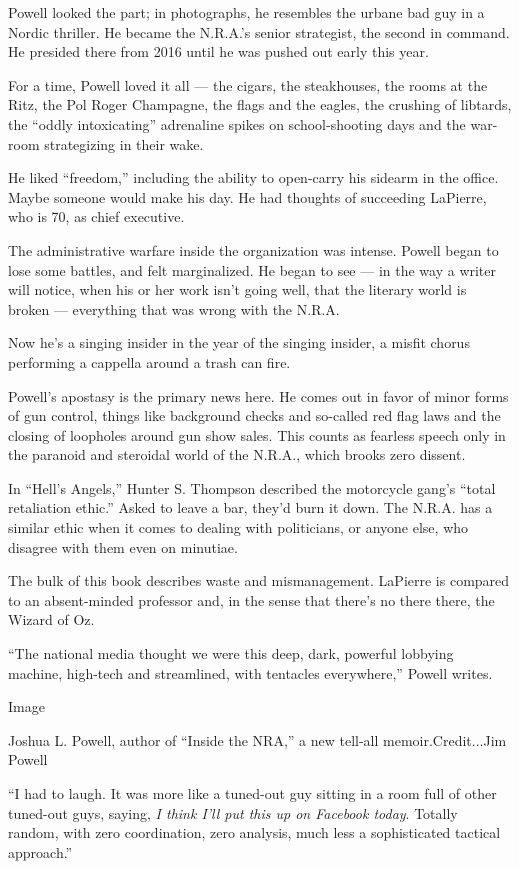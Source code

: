 Powell looked the part; in photographs, he resembles the urbane bad guy
in a Nordic thriller. He became the N.R.A.'s senior strategist, the
second in command. He presided there from 2016 until he was pushed out
early this year.

For a time, Powell loved it all --- the cigars, the steakhouses, the
rooms at the Ritz, the Pol Roger Champagne, the flags and the eagles,
the crushing of libtards, the ``oddly intoxicating'' adrenaline spikes
on school-shooting days and the war-room strategizing in their wake.

He liked ``freedom,'' including the ability to open-carry his sidearm in
the office. Maybe someone would make his day. He had thoughts of
succeeding LaPierre, who is 70, as chief executive.

The administrative warfare inside the organization was intense. Powell
began to lose some battles, and felt marginalized. He began to see ---
in the way a writer will notice, when his or her work isn't going well,
that the literary world is broken --- everything that was wrong with the
N.R.A.

Now he's a singing insider in the year of the singing insider, a misfit
chorus performing a cappella around a trash can fire.

Powell's apostasy is the primary news here. He comes out in favor of
minor forms of gun control, things like background checks and so-called
red flag laws and the closing of loopholes around gun show sales. This
counts as fearless speech only in the paranoid and steroidal world of
the N.R.A., which brooks zero dissent.

In ``Hell's Angels,'' Hunter S. Thompson described the motorcycle gang's
``total retaliation ethic.'' Asked to leave a bar, they'd burn it down.
The N.R.A. has a similar ethic when it comes to dealing with
politicians, or anyone else, who disagree with them even on minutiae.

The bulk of this book describes waste and mismanagement. LaPierre is
compared to an absent-minded professor and, in the sense that there's no
there there, the Wizard of Oz.

``The national media thought we were this deep, dark, powerful lobbying
machine, high-tech and streamlined, with tentacles everywhere,'' Powell
writes.

Image

Joshua L. Powell, author of ``Inside the NRA,'' a new tell-all
memoir.Credit...Jim Powell

``I had to laugh. It was more like a tuned-out guy sitting in a room
full of other tuned-out guys, saying, \emph{I think I'll put this up on
Facebook today}. Totally random, with zero coordination, zero analysis,
much less a sophisticated tactical approach.''

